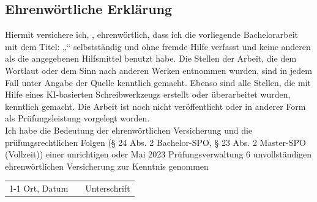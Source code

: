 \cleardoubleemptypage
\thispagestyle{empty}
\subsection*{Ehrenwörtliche Erklärung}
Hiermit versichere ich, \VARname, ehrenwörtlich, dass ich die vorliegende
Bachelorarbeit mit dem Titel: „\VARtitel“ selbstständig und ohne fremde Hilfe verfasst und keine anderen als die angegebenen
Hilfsmittel benutzt habe. Die Stellen der Arbeit, die dem Wortlaut oder dem Sinn nach anderen Werken
entnommen wurden, sind in jedem Fall unter Angabe der Quelle kenntlich gemacht. Ebenso sind alle
Stellen, die mit Hilfe eines KI-basierten Schreibwerkzeugs erstellt oder überarbeitet wurden, kenntlich
gemacht. Die Arbeit ist noch nicht veröffentlicht oder in anderer Form als Prüfungsleistung vorgelegt
worden. \\  
Ich habe die Bedeutung der ehrenwörtlichen Versicherung und die prüfungsrechtlichen Folgen
(§ 24 Abs. 2 Bachelor-SPO, § 23 Abs. 2 Master-SPO (Vollzeit)) einer unrichtigen oder
Mai 2023 Prüfungsverwaltung 6
unvollständigen ehrenwörtlichen Versicherung zur Kenntnis genommen

\vspace{4\baselineskip}

\begin{tabular}{lp{2em}l}
	\hspace{5cm}   && \hspace{4cm} \\
	\cline{1-1}\cline{3-3}
	Ort, Datum     && Unterschrift
\end{tabular} 
